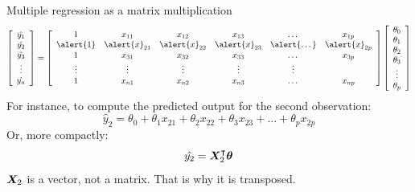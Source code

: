 \documentclass[aspectratio=169]{../latex_main/tntbeamer}  %
\begin{document}
	
	\begin{frame}{Multiple regression as a matrix multiplication}
	  \begin{align*}
	       \left[\begin{array}{c}
	          \hat{y_1}\\ 
	          \hat{y_2}\\ 
	          \hat{y_3}\\ 
	          \vdots  \\
	          \hat{y_n}\\ 
	    \end{array}\right] = \left[\begin{array}{cccccc}
	          1 & x_{11} & x_{12} & x_{13} & \dots & x_{1p}\\
	          \alert{1} & \alert{x}_{21} & \alert{x}_{22} & \alert{x}_{23} & \alert{\dots} & \alert{x}_{2p}\\
	          1 & x_{31} & x_{32} & x_{33} & \dots & x_{3p}\\
	          \vdots     & \vdots & \vdots &\vdots &  \vdots \\
	          1 & x_{n1} & x_{n2} & x_{n3} & \dots & x_{np}\\
	    \end{array}\right]
	    \left[\begin{array}{c}
	          \theta_0\\
	          \theta_1\\ 
	          \theta_2\\ 
	          \theta_3\\ 
	          \vdots  \\
	          \theta_p\\ 
	    \end{array}\right]
	  \end{align*}
	  For instance, to compute the predicted output for the second observation:
        \begin{equation*}
            \hat{y}_2 = \theta_0 + \theta_1x_{21} + \theta_2x_{22} + \theta_3x_{23} + ... + \theta_px_{2p}
        \end{equation*}
        Or, more compactly:
        \begin{equation*}
            \hat{y_2} = \bm{X}_2^\intercal \bm{\theta}
        \end{equation*}
        $\bm{X}_2$ is a vector, not a matrix. That is why it is transposed.

	\end{frame}
	
\end{document}
